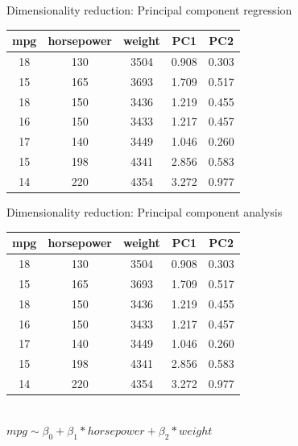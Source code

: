 \documentclass[8pt]{beamer}
\begin{document}
    \begin{frame}[t]{Dimensionality reduction: Principal component regression} %
        \centering
        \vspace{1cm}
        \begin{tabular}{|c|c|c|c|c|}
            \hline
            \textbf{mpg}&\textbf{horsepower}&\textbf{weight}&\textbf{PC1}&\textbf{PC2}\\
            \hline
            18&130&3504&0.908&0.303\\
            \hline
            15&165&3693&1.709&0.517\\
            \hline
            18&150&3436&1.219&0.455\\
            \hline
            16&150&3433&1.217&0.457\\
            \hline
            17&140&3449&1.046&0.260\\
            \hline
            15&198&4341&2.856&0.583\\
            \hline
            14&220&4354&3.272&0.977\\
            \hline
        \end{tabular}
    \end{frame}

    \begin{frame}[t]{Dimensionality reduction: Principal component analysis} %
        \centering
        \vspace{1cm}
        \begin{tabular}{|c|c|c|c|c|}
            \hline
            \textbf{mpg}&\textbf{horsepower}&\textbf{weight}&\textbf{PC1}&\textbf{PC2}\\
            \hline
            18&130&3504&0.908&0.303\\
            \hline
            15&165&3693&1.709&0.517\\
            \hline
            18&150&3436&1.219&0.455\\
            \hline
            16&150&3433&1.217&0.457\\
            \hline
            17&140&3449&1.046&0.260\\
            \hline
            15&198&4341&2.856&0.583\\
            \hline
            14&220&4354&3.272&0.977\\
            \hline
        \end{tabular}\\
        \vspace{0.5cm}
        $mpg \sim \beta_0 + \beta_1 * horsepower + \beta_2 * weight$\\
    \end{frame}
\end{document}
